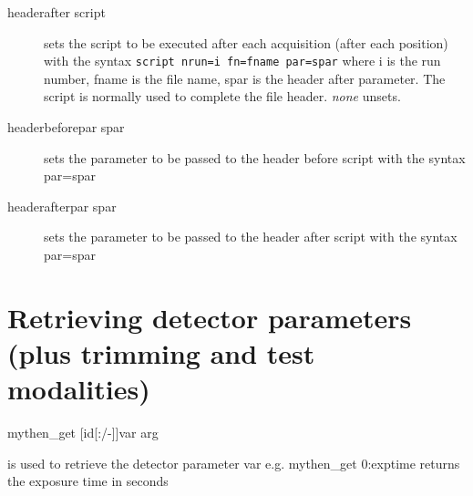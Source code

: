\documentclass{report}
\begin{document}
\begin{description}
\item[headerafter script] sets the script to be executed after each acquisition (after each position) with the syntax \verb|script nrun=i fn=fname par=spar| where i is the run number, fname is the file name, spar is the header after parameter. The script is normally used to complete the file header. \textit{none} unsets.
\item[headerbeforepar spar] sets the parameter to be passed to the header before script with the syntax par=spar
\item[headerafterpar spar] sets the parameter to be passed to the header after script with the syntax par=spar
\end{description}




\section{Retrieving detector parameters (plus trimming and test modalities)}
mythen\_get [id[:/-]]var arg

is used to retrieve the detector parameter var
  e.g. mythen\_get 0:exptime returns the exposure time in seconds
\end{document}
